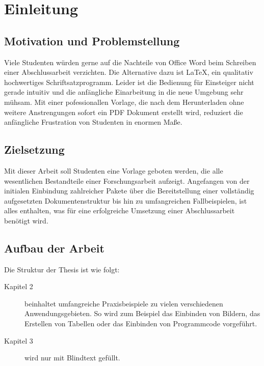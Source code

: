 \chapter{Einleitung}
\label{chap:einleitung}


\section{Motivation und Problemstellung}
\label{sec:motivation-und-problemstellung}
Viele Studenten würden gerne auf die Nachteile von Office Word beim Schreiben einer Abschlussarbeit verzichten. Die Alternative dazu ist \LaTeX, ein qualitativ hochwertiges Schriftsatzprogramm. Leider ist die Bedienung für Einsteiger nicht gerade intuitiv und die anfängliche Einarbeitung in die neue Umgebung sehr mühsam. Mit einer pofessionallen Vorlage, die nach dem Herunterladen ohne weitere Anstrengungen sofort ein PDF Dokument erstellt wird, reduziert die anfängliche Frustration von Studenten in enormen Maße.

\section{Zielsetzung}
\label{sec:zielsetzung}
Mit dieser Arbeit soll Studenten eine Vorlage geboten werden, die alle wesentlichen Bestandteile einer Forschungsarbeit aufzeigt. Angefangen von der initialen Einbindung zahlreicher Pakete über die Bereitstellung einer vollständig aufgesetzten Dokumentenstruktur bis hin zu umfangreichen Fallbeispielen, ist alles enthalten, was für eine erfolgreiche Umsetzung einer Abschlussarbeit benötigt wird.


\section{Aufbau der Arbeit}
\label{sec:struktur}
Die Struktur der Thesis ist wie folgt:
\begin{description}
  \item[Kapitel 2] beinhaltet umfangreiche Praxisbeispiele zu vielen verschiedenen Anwendungsgebieten. So wird zum Beispiel das Einbinden von Bildern, das Erstellen von Tabellen oder das Einbinden von Programmcode vorgeführt.
  \item[Kapitel 3] wird nur mit Blindtext gefüllt.
\end{description}

